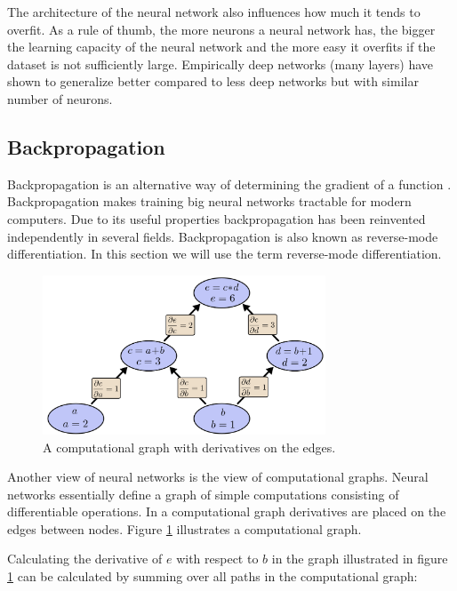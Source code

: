 \documentclass[draft,final,oneside]{vutinfth} %
\begin{document}
The architecture of the neural network also influences how much it tends to overfit. As a rule of thumb, the more neurons a neural network has, the bigger the learning capacity of the neural network and the more easy it overfits if the dataset is not sufficiently large. Empirically deep networks (many layers) have shown to generalize better compared to less deep networks but with similar number of neurons.

\subsection{Backpropagation}

Backpropagation is an alternative way of determining the gradient of a function \cite{colahbackprop}. Backpropagation makes training big neural networks tractable for modern computers. Due to its useful properties backpropagation has been reinvented independently in several fields. \cite{Griewank2012WhoIT} Backpropagation is also known as reverse-mode differentiation. In this section we will use the term reverse-mode differentiation.

\begin{figure}[ht]
	\centering
  	\includegraphics[width=0.75\textwidth]{graphics/computationgraph.png}
	\caption{A computational graph with derivatives on the edges. \cite{colahbackprop}}
	\label{fig:computationgraph}
\end{figure}


Another view of neural networks is the view of computational graphs. Neural networks essentially define a graph of simple computations consisting of differentiable operations. In a computational graph derivatives are placed on the edges between nodes. Figure \ref{fig:computationgraph} illustrates a computational graph.

Calculating the derivative of $e$ with respect to $b$ in the graph illustrated in figure \ref{fig:computationgraph} can be calculated by summing over all paths in the computational graph:
\end{document}
